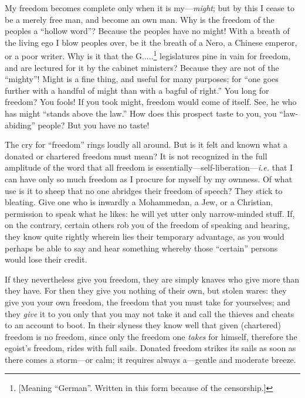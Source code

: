 My freedom becomes complete only when it is my---\textit{might}; but by this 
I cease to be a merely free man, and become an own man. Why is the freedom of 
the peoples a ``hollow word''? Because the peoples have no might! With a 
breath of the living ego I blow peoples over, be it the breath of a Nero, a 
Chinese emperor, or a poor writer. Why is it that the G.....\footnote{[Meaning 
``German''. Written in this form because of the censorship.]} legislatures 
pine in vain for freedom, and are lectured for it by the cabinet ministers? 
Because they are not of the ``mighty''! Might is a fine thing, and useful 
for many purposes; for ``one goes further with a handful of might than with a 
bagful of right.'' You long for freedom? You fools! If you took might, 
freedom would come of itself. See, he who has might ``stands above the 
law.'' How does this prospect taste to you, you ``law-abiding'' people? But 
you have no taste!

The cry for ``freedom'' rings loudly all around. But is it felt and known 
what a donated or chartered freedom must mean? It is not recognized in the 
full amplitude of the word that all freedom is essentially---self-liberation---\textit{i.e.} that I can have only so much freedom as I procure for myself 
by my ownness. Of what use is it to sheep that no one abridges their freedom 
of speech? They stick to bleating. Give one who is inwardly a Mohammedan, a 
Jew, or a Christian, permission to speak what he likes: he will yet utter only 
narrow-minded stuff. If, on the contrary, certain others rob you of the 
freedom of speaking and hearing, they know quite rightly wherein lies their 
temporary advantage, as you would perhaps be able to say and hear something 
whereby those ``certain'' persons would lose their credit.

If they nevertheless give you freedom, they are simply knaves who give more 
than they have. For then they give you nothing of their own, but stolen wares: 
they give you your own freedom, the freedom that you must take for yourselves; 
and they \textit{give} it to you only that you may not take it and call the 
thieves and cheats to an account to boot. In their slyness they know well that 
given (chartered) freedom is no freedom, since only the freedom one 
\textit{takes} for himself, therefore the egoist's freedom, rides with full 
sails. Donated freedom strikes its sails as soon as there comes a storm---or 
calm; it requires always a---gentle and moderate breeze.

